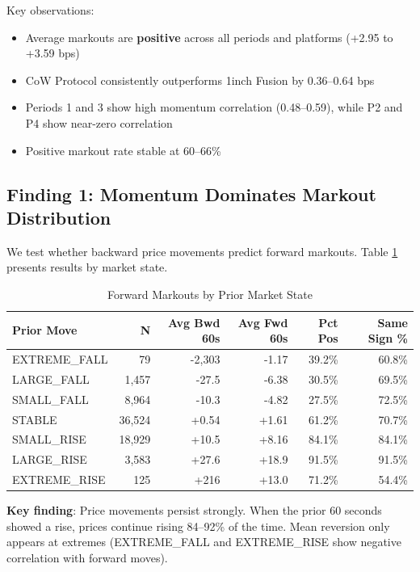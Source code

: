 \documentclass[12pt,a4paper]{article}
\begin{document}
Key observations:
\begin{itemize}
    \item Average markouts are \textbf{positive} across all periods and platforms (+2.95 to +3.59 bps)
    \item CoW Protocol consistently outperforms 1inch Fusion by 0.36--0.64 bps
    \item Periods 1 and 3 show high momentum correlation (0.48--0.59), while P2 and P4 show near-zero correlation
    \item Positive markout rate stable at 60--66\%
\end{itemize}

\subsection{Finding 1: Momentum Dominates Markout Distribution}

We test whether backward price movements predict forward markouts. Table \ref{tab:momentum} presents results by market state.

\begin{table}[H]
\centering
\caption{Forward Markouts by Prior Market State}
\label{tab:momentum}
\begin{tabular}{lrrrrr}
\toprule
\textbf{Prior Move} & \textbf{N} & \textbf{Avg Bwd 60s} & \textbf{Avg Fwd 60s} & \textbf{Pct Pos} & \textbf{Same Sign \%} \\
\midrule
EXTREME\_FALL & 79 & -2,303 & -1.17 & 39.2\% & 60.8\% \\
LARGE\_FALL & 1,457 & -27.5 & -6.38 & 30.5\% & 69.5\% \\
SMALL\_FALL & 8,964 & -10.3 & -4.82 & 27.5\% & 72.5\% \\
STABLE & 36,524 & +0.54 & +1.61 & 61.2\% & 70.7\% \\
SMALL\_RISE & 18,929 & +10.5 & +8.16 & 84.1\% & 84.1\% \\
LARGE\_RISE & 3,583 & +27.6 & +18.9 & 91.5\% & 91.5\% \\
EXTREME\_RISE & 125 & +216 & +13.0 & 71.2\% & 54.4\% \\
\bottomrule
\end{tabular}
\end{table}

\textbf{Key finding}: Price movements persist strongly. When the prior 60 seconds showed a rise, prices continue rising 84--92\% of the time. Mean reversion only appears at extremes (EXTREME\_FALL and EXTREME\_RISE show negative correlation with forward moves).
\end{document}

